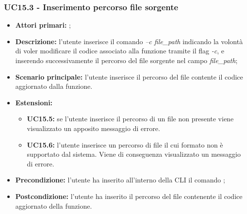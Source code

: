 \subsubsection{UC15.3 - Inserimento percorso file sorgente}
\begin{itemize}
	\item \textbf{Attori primari:} \us{};
	\item \textbf{Descrizione:} l'utente inserisce il comando \pedit{} \textit{–c file\_path} indicando la volontà di voler modificare il codice associato alla funzione tramite il flag \textit{-c}, e inserendo successivamente il percorso del file sorgente nel campo \textit{file\_path}; 
	\item \textbf{Scenario principale:} l'utente inserisce il percorso del file contente il codice aggiornato dalla funzione. 
	\item \textbf{Estensioni:} 
	\begin{itemize}
		\item \textbf{UC15.5:} se l'utente inserisce il percorso di un file non presente viene visualizzato un apposito messaggio di errore.
		\item \textbf{UC15.6:} l’utente inserisce un percorso di file il cui formato non è supportato dal sistema. Viene di conseguenza visualizzato un messaggio di errore.
	\end{itemize}
	\item \textbf{Precondizione:} l’utente ha inserito all’interno della CLI il comando \edit{}; 
	\item \textbf{Postcondizione:} l’utente ha inserito il percorso del file contenente il codice aggiornato della funzione.
\end{itemize}